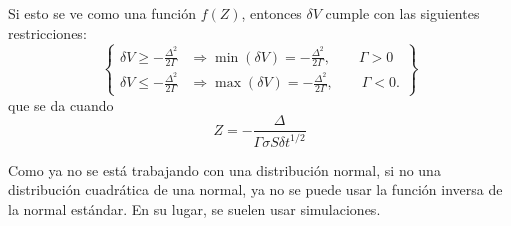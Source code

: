 Si esto se ve como una función $f(Z)$, entonces $\delta V$ cumple con las siguientes restricciones:
\[
    \left\{
    \begin{aligned}
        \delta V \geq -\frac{\Delta^2}{2\Gamma} &\Rightarrow \min(\delta V) = -\frac{\Delta^2}{2\Gamma}, \qquad \Gamma > 0 \\
        \delta V \leq -\frac{\Delta^2}{2\Gamma} &\Rightarrow \max(\delta V) = -\frac{\Delta^2}{2\Gamma}, \qquad \Gamma < 0.
    \end{aligned}
    \right\}
\]
que se da cuando
\[
    Z = -\frac{\Delta}{\Gamma \sigma S \delta t^{1/2}}
\]

Como ya no se está trabajando con una distribución normal, si no una distribución cuadrática de una normal, ya no se puede usar la función inversa de la normal estándar. En su lugar, se suelen usar simulaciones.













